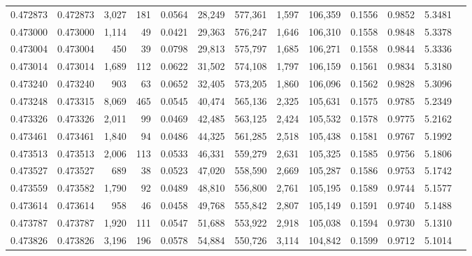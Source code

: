 \begin{tabular}{rrrrrrrrrrrrr}
0.472873 & 0.472873 & 3,027 &   181 &                                     0.0564 &  28,249 & 577,361 &   1,597 & 106,359 & 0.1556 & 0.9852 & 5.3481 \\
0.473000 & 0.473000 & 1,114 &    49 &                                     0.0421 &  29,363 & 576,247 &   1,646 & 106,310 & 0.1558 & 0.9848 & 5.3378 \\
0.473004 & 0.473004 &   450 &    39 &                                     0.0798 &  29,813 & 575,797 &   1,685 & 106,271 & 0.1558 & 0.9844 & 5.3336 \\
0.473014 & 0.473014 & 1,689 &   112 &                                     0.0622 &  31,502 & 574,108 &   1,797 & 106,159 & 0.1561 & 0.9834 & 5.3180 \\
0.473240 & 0.473240 &   903 &    63 &                                     0.0652 &  32,405 & 573,205 &   1,860 & 106,096 & 0.1562 & 0.9828 & 5.3096 \\
0.473248 & 0.473315 & 8,069 &   465 &                                     0.0545 &  40,474 & 565,136 &   2,325 & 105,631 & 0.1575 & 0.9785 & 5.2349 \\
0.473326 & 0.473326 & 2,011 &    99 &                                     0.0469 &  42,485 & 563,125 &   2,424 & 105,532 & 0.1578 & 0.9775 & 5.2162 \\
0.473461 & 0.473461 & 1,840 &    94 &                                     0.0486 &  44,325 & 561,285 &   2,518 & 105,438 & 0.1581 & 0.9767 & 5.1992 \\
0.473513 & 0.473513 & 2,006 &   113 &                                     0.0533 &  46,331 & 559,279 &   2,631 & 105,325 & 0.1585 & 0.9756 & 5.1806 \\
0.473527 & 0.473527 &   689 &    38 &                                     0.0523 &  47,020 & 558,590 &   2,669 & 105,287 & 0.1586 & 0.9753 & 5.1742 \\
0.473559 & 0.473582 & 1,790 &    92 &                                     0.0489 &  48,810 & 556,800 &   2,761 & 105,195 & 0.1589 & 0.9744 & 5.1577 \\
0.473614 & 0.473614 &   958 &    46 &                                     0.0458 &  49,768 & 555,842 &   2,807 & 105,149 & 0.1591 & 0.9740 & 5.1488 \\
0.473787 & 0.473787 & 1,920 &   111 &                                     0.0547 &  51,688 & 553,922 &   2,918 & 105,038 & 0.1594 & 0.9730 & 5.1310 \\
0.473826 & 0.473826 & 3,196 &   196 &                                     0.0578 &  54,884 & 550,726 &   3,114 & 104,842 & 0.1599 & 0.9712 & 5.1014 \\

\end{tabular}

